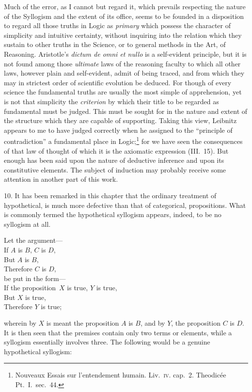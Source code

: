 \documentclass[oneside]{book}
\begin{document}
Much of the error, as I cannot but regard it, which prevails
respecting the nature of the Syllogism and the extent of its
office, seems to be founded in a disposition to regard all those
truths in Logic as \emph{primary} which possess the character of simplicity
and intuitive certainty, without inquiring into the relation
which they sustain to other truths in the Science, or to general
methods in the Art, of Reasoning. Aristotle's \textit{dictum de omni et
nullo} is a self-evident principle, but it is not found among those
\emph{ultimate} laws of the reasoning faculty to which all other laws,
however plain and self-evident, admit of being traced, and from
which they may in strictest order of scientific evolution be deduced.
For though of every science the fundamental truths are
usually the most simple of apprehension, yet is not that simplicity
the \emph{criterion} by which their title to be regarded as fundamental
must be judged. This must be sought for in the nature
and extent of the structure which they are capable of supporting.
Taking this view, Leibnitz appears to me to have judged correctly
when he assigned to the ``principle of contradiction'' a
fundamental place in Logic;\footnote{Nouveaux Essais sur l'entendement humain. Liv.~\textsc{iv.} cap.~2. Theodic\'{e}e Pt.~I.\ sec.~44.} for we have seen the consequences
of that law of thought of which it is the axiomatic expression
(III.~15). But enough has been said upon the nature of deductive
inference and upon its constitutive elements. The subject of
induction may probably receive some attention in another part of
this work.

10. It has been remarked in this chapter that the ordinary
treatment of hypothetical, is much more defective than that of
categorical, propositions. What is commonly termed the hypothetical
syllogism appears, indeed, to be no syllogism at all.
\begin{tabbing}
Let the argument--- \= \\
                     \>If $A$ is $B$, $C$ is $D$,   \\
                     \>But $A$ is $B$,   \\
                     \>Therefore $C$ is $D$,   \\
be put in the form---   \\
\hfill If the proposition\ \>$X$ is true, $Y$ is true,   \\
                     \>But $X$ is true,   \\
                     \>Therefore $Y$ is true;
\end{tabbing}
wherein by $X$ is meant the proposition $A$ is $B$, and by $Y$, the
proposition $C$ is $D$. It is then seen that the premises contain
only two terms or elements, while a syllogism essentially involves
three. The following would be a genuine hypothetical syllogism:
\end{document}

